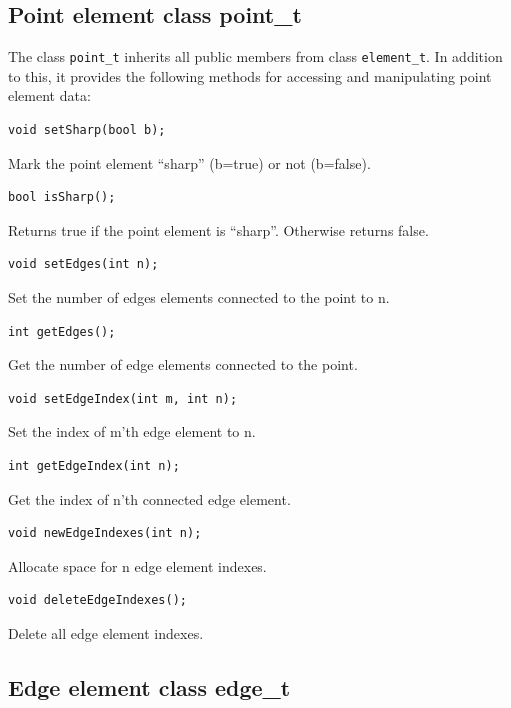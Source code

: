 \documentclass[a4paper,12pt]{article}
\begin{document}
\subsection{Point element class point\_t}

The class {\tt point\_t} inherits all public members from class {\tt element\_t}.
In addition to this, it provides the following methods for accessing and
manipulating point element data:
\begin{verbatim}
void setSharp(bool b);
\end{verbatim}
Mark the point element ``sharp'' (b=true) or not (b=false).
\begin{verbatim}
bool isSharp();
\end{verbatim}
Returns true if the point element is ``sharp''. Otherwise returns false.
\begin{verbatim}
void setEdges(int n);
\end{verbatim}
Set the number of edges elements connected to the point to n.
\begin{verbatim}
int getEdges();
\end{verbatim}
Get the number of edge elements connected to the point.
\begin{verbatim}
void setEdgeIndex(int m, int n);
\end{verbatim}
Set the index of m'th edge element to n.
\begin{verbatim}
int getEdgeIndex(int n);
\end{verbatim}
Get the index of n'th connected edge element.
\begin{verbatim}
void newEdgeIndexes(int n);
\end{verbatim}
Allocate space for n edge element indexes.
\begin{verbatim}
void deleteEdgeIndexes();
\end{verbatim}
Delete all edge element indexes.

\subsection{Edge element class edge\_t}
\end{document}
